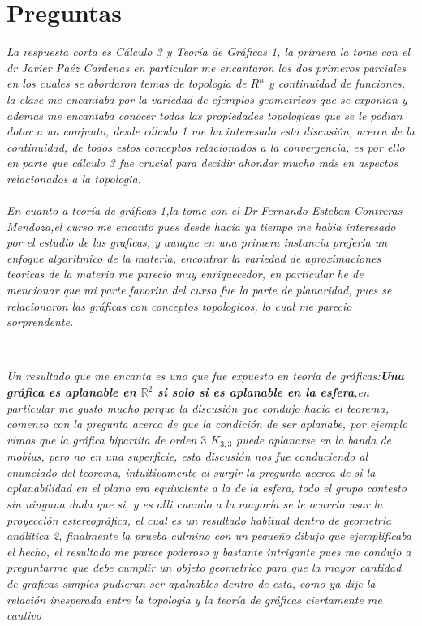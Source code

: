 \documentclass[11pt,letterpaper]{article}
\newcommand{\R}{\mathbb{R}}
\begin{document}
\section*{Preguntas}
\begin{tcolorbox}[ 
	title = \textcolor{black}{\textcolor{white}{ ¿Cu\'ales de las materias que has cursado te han gustado m\'as?
}},]
\textit{La respuesta corta es C\'alculo 3 y Teor\'ia de Gr\'aficas 1, la primera la tome con el dr Javier Pa\'ez Cardenas en particular me encantaron los dos primeros parciales
en los cuales se abordaron temas de topologia de $R^n$ y continuidad de funciones, la clase me encantaba por la variedad de ejemplos geometricos que se exponian y ademas me encantaba conocer todas las propiedades topologicas que se le podian dotar a un conjunto, desde c\'alculo 1 me ha interesado esta discusi\'on, acerca de la continuidad, de todos estos conceptos relacionados a la
convergencia, es por ello en parte que c\'alculo 3 fue crucial para decidir ahondar mucho m\'as en aspectos relacionados a la topologia.\,\\
\,\\
En cuanto a teor\'ia de gr\'aficas 1,la tome con el Dr Fernando Esteban Contreras Mendoza,el curso me encanto pues desde hacia ya tiempo me habia interesado por el estudio de las graficas, y aunque en una primera instancia preferia un enfoque algoritmico de la materia, encontrar la variedad de aproximaciones teoricas de la materia me parecio muy enriquecedor,
en particular he de mencionar que mi parte favorita del curso fue la parte de planaridad, pues se relacionaron las gr\'aficas con conceptos topologicos, lo cual me parecio sorprendente.}
\end{tcolorbox}\,\\
\begin{tcolorbox}[ 
	title = \textcolor{black}{\textcolor{white}{ Menciona alg\'un resultado o ejemplo de alguno de los cursos que has llevado, que te haya gustado. Explica
por qu\'e te gusta.}},]
\textit{ Un resultado que me encanta es uno que fue expuesto en teor\'ia de gr\'aficas:\textbf{Una gr\'afica es aplanable en $\R^2$ si solo si es aplanable en la esfera},en particular me gusto mucho
porque la discusi\'on que condujo hacia el teorema, comenzo con la pregunta acerca de que la condici\'on de ser aplanabe, por ejemplo vimos que la gr\'afica bipartita de orden $3$ $K_{3,3}$ puede aplanarse en la banda de mobius, pero no en una superficie, esta discusi\'on nos fue conduciendo al enunciado del teorema, intuitivamente
al surgir la pregunta acerca de si la aplanabilidad en el plano era equivalente a la de la esfera, todo el grupo contesto sin ninguna duda que si, y es alli cuando a la mayor\'ia se le ocurrio usar la proyecci\'on estereogr\'afica, el cual es un resultado habitual dentro de geometria an\'alitica 2, finalmente la prueba culmino con un pequeño dibujo que ejemplificaba el hecho, el resultado me parece
poderoso y bastante intrigante pues me condujo a preguntarme que debe cumplir un objeto geometrico para que la mayor cantidad de graficas simples pudieran ser apalnables dentro de esta, como ya dije la relaci\'on inesperada entre la topologia y la teor\'ia de gr\'aficas ciertamente me cautivo}
\end{tcolorbox}\,\\
\end{document}
